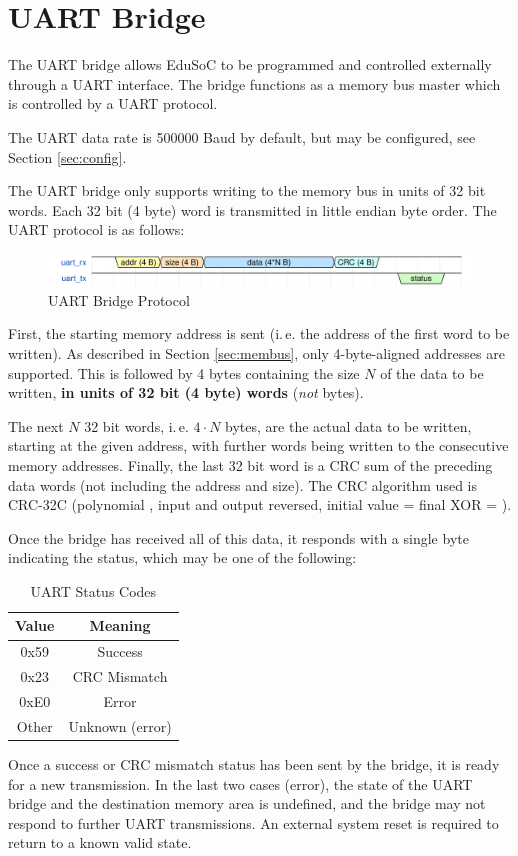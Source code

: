 \newpage
\section{UART Bridge}\label{sec:uart}
The UART bridge allows EduSoC to be programmed and controlled externally through a UART interface.
The bridge functions as a memory bus master which is controlled by a UART protocol.

The UART data rate is 500000 Baud by default, but may be configured, see Section \ref{sec:config}.

The UART bridge only supports writing to the memory bus in units of 32 bit words. Each 32 bit (4 byte) word is transmitted in little endian byte order.
The UART protocol is as follows:\\
\begin{figure}[H]
    \centering
    \includegraphics[width=\textwidth]{graphics/EduSoC_UART_Protocol.svg}
    \vspace{-1em}
    \caption{UART Bridge Protocol}
    \label{fig:uart_protocol}
\end{figure}
First, the starting memory address is sent (i.\,e. the address of the first word to be written). As described in Section \ref{sec:membus}, only 4-byte-aligned addresses are supported. This is followed by 4 bytes containing the size $N$ of the data to be written, \textbf{in units of 32 bit (4 byte) words} (\textit{not} bytes).

The next $N$ 32 bit words, i.\,e. $4 \cdot N$ bytes, are the actual data to be written, starting at the given address, with further words being written to the consecutive memory addresses. Finally, the last 32 bit word is a CRC sum of the preceding data words (not including the address and size). The CRC algorithm used is CRC-32C (polynomial , input and output reversed, initial value = final XOR = ).

Once the bridge has received all of this data, it responds with a single byte indicating the status, which may be one of the following:\\
\begin{table}[H]
    \centering
    \begin{tabular}{|c|c|}\hline
        Value & Meaning \\\hline\hline
        0x59 & Success \\
        0x23 & CRC Mismatch \\
        0xE0 & Error \\
        Other & Unknown (error) \\\hline
    \end{tabular}
    \caption{UART Status Codes}
    \label{tab:uart_status}
\end{table}
Once a success or CRC mismatch status has been sent by the bridge, it is ready for a new transmission.
In the last two cases (error), the state of the UART bridge and the destination memory area is undefined, and the bridge may not respond to further UART transmissions. An external system reset is required to return to a known valid state.

